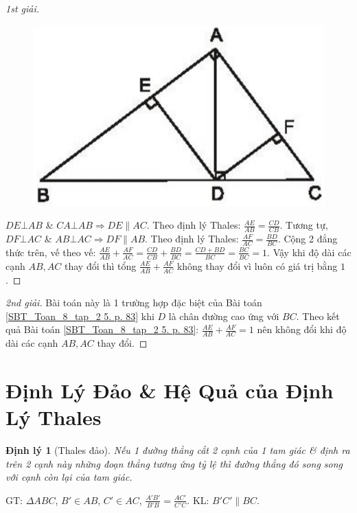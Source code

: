 \documentclass{article}
\newtheorem{dinhly}{Định lý}
\begin{document}
\begin{proof}[1st giải]
	\begin{figure}[H]
		\centering
		\includegraphics[scale=0.2]{SBT_Toan_8_bs7}
	\end{figure}
	$DE\bot AB$ \& $CA\bot AB\Rightarrow DE\parallel AC$. Theo định lý Thales: $\frac{AE}{AB} = \frac{CD}{CB}$. Tương tự, $DF\bot AC$ \& $AB\bot AC\Rightarrow DF\parallel AB$. Theo định lý Thales: $\frac{AF}{AC} = \frac{BD}{BC}$. Cộng 2 đẳng thức trên, vế theo vế: $\frac{AE}{AB} + \frac{AF}{AC} = \frac{CD}{CB} + \frac{BD}{BC} = \frac{CD + BD}{BC} = \frac{BC}{BC} = 1$. Vậy khi độ dài các cạnh $AB,AC$ thay đổi thì tổng $\frac{AE}{AB} + \frac{AF}{AC}$ không thay đổi vì luôn có giá trị bằng $1$.
\end{proof}

\begin{proof}[2nd giải]
	Bài toán này là 1 trường hợp đặc biệt của Bài toán \ref{SBT_Toan_8_tap_2 5. p. 83} khi $D$ là chân đường cao ứng với $BC$. Theo kết quả Bài toán \ref{SBT_Toan_8_tap_2 5. p. 83}: $\frac{AE}{AB} + \frac{AF}{AC} = 1$ nên không đổi khi độ dài các cạnh $AB,AC$ thay đổi.
\end{proof}


\section{Định Lý Đảo \& Hệ Quả của Định Lý Thales}

\begin{dinhly}[Thales đảo]
	Nếu 1 đường thẳng cắt 2 cạnh của 1 tam giác \& định ra trên 2 cạnh này những đoạn thẳng tương ứng tỷ lệ thì đường thẳng đó song song với cạnh còn lại của tam giác.
\end{dinhly}
GT: $\Delta ABC$, $B'\in AB$, $C'\in AC$, $\frac{A'B'}{B'B} = \frac{AC'}{C'C}$. KL: $B'C'\parallel BC$.
\end{document}
